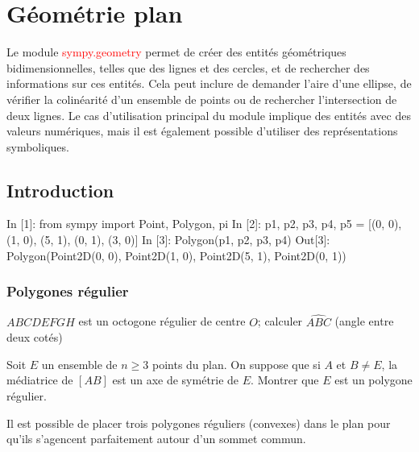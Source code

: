 \chapter{Géométrie plan}
Le module \textcolor{red}{sympy.geometry} permet de créer des entités géométriques bidimensionnelles, telles que des lignes et des cercles, et de rechercher des informations sur ces entités. Cela peut inclure de demander l’aire d’une ellipse, de vérifier la colinéarité d’un ensemble de points ou de rechercher l’intersection de deux lignes. Le cas d'utilisation principal du module implique des entités avec des valeurs numériques, mais il est également possible d'utiliser des représentations symboliques.

\section{Introduction}

\begin{python}
In [1]: from sympy import Point, Polygon, pi
In [2]: p1, p2, p3, p4, p5 = [(0, 0), (1, 0), (5, 1), (0, 1), (3, 0)]
In [3]: Polygon(p1, p2, p3, p4)
Out[3]: Polygon(Point2D(0, 0), Point2D(1, 0), Point2D(5, 1), Point2D(0, 1))
\end{python}

\subsection{Polygones régulier}


\begin{example}
$ABCDEFGH$ est un octogone régulier de centre $O$; calculer $\widehat{ABC}$ (angle entre deux cotés)
\end{example}

\begin{exercise}
Soit $E$ un ensemble de $n \geq 3$ points du plan. On suppose que si $A$ et $B \neq E$, la médiatrice
de $\left[AB\right]$ est un axe de symétrie de $E$. Montrer que $E$ est un polygone régulier.
\end{exercise}

\begin{exercise}
Il est possible de placer trois polygones réguliers (convexes) dans le plan pour qu'ils s'agencent parfaitement autour d'un sommet commun.
\end{exercise}
